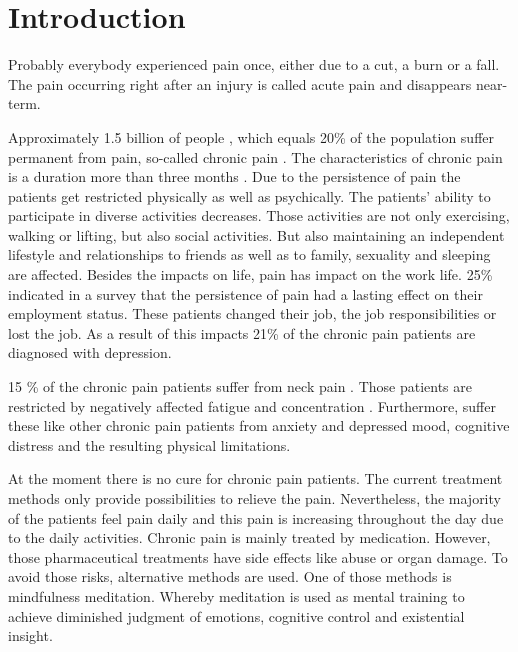 \chapter{Introduction}

Probably everybody experienced pain once, either due to a cut, a burn or a fall. The pain occurring right after an injury is called acute pain and disappears near-term. \cite{Briggs2010;Mello2016}

Approximately 1.5 billion of people \cite{Zeidan2016}, which equals 20\% of the population suffer permanent from pain, so-called chronic pain \cite{Macfarlanea2016}. The characteristics of chronic pain is a duration more than three months \cite{Mello2016}. Due to the persistence of pain the patients get restricted physically as well as psychically. 
The patients' ability to participate in diverse activities decreases. Those activities are not only exercising, walking or lifting, but also social activities. But also maintaining an independent lifestyle and relationships to friends as well as to family, sexuality and sleeping are affected. Besides the impacts on life, pain has impact on the work life. 25\% indicated in a survey that the persistence of pain had a lasting effect on their employment status. These patients changed their job, the job responsibilities or lost the job. 
As a result of this impacts 21\% of the chronic pain patients are diagnosed with depression. \cite{Breivik2006}

15 \% of the chronic pain patients suffer from neck pain \cite{Macfarlanea2016}. Those patients are restricted by negatively affected fatigue and concentration \cite{vanRanderaat2016}. Furthermore, suffer these like other chronic pain patients from anxiety and depressed mood, cognitive distress and the resulting physical limitations. \cite{gross2013}

At the moment there is no cure for chronic pain patients. The current treatment methods only provide possibilities to relieve the pain. \cite{marcus2009;pope2017} Nevertheless, the majority of the patients feel pain daily and this pain is increasing throughout the day due to the daily activities. \cite{Breivik2006}
Chronic pain is mainly treated by medication. However, those pharmaceutical treatments have side effects like abuse or organ damage. To avoid those risks, alternative methods are used. One of those methods is mindfulness meditation. Whereby meditation is used as mental training to achieve diminished judgment of emotions, cognitive control and existential insight. \cite{zeidan2012}

